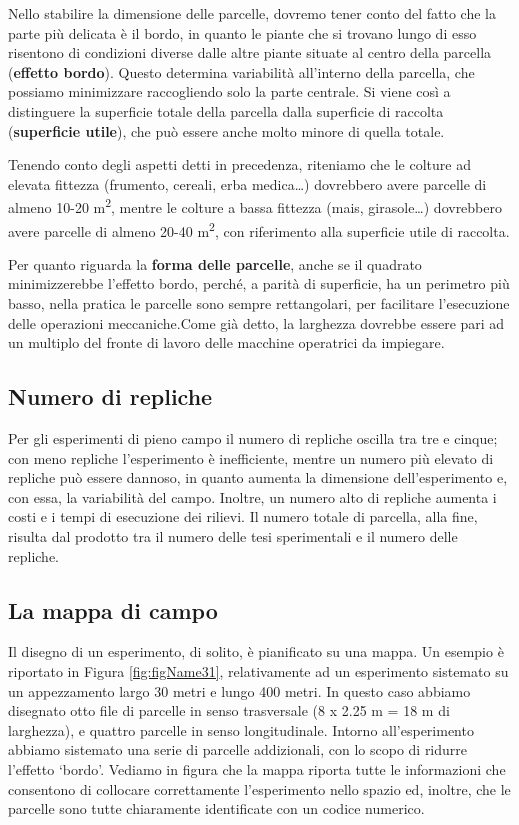\documentclass[a4paper,12pt,oneside]{book}
\begin{document}
Nello stabilire la dimensione delle parcelle, dovremo tener conto del fatto che la parte più delicata è il bordo, in quanto le piante che si trovano lungo di esso risentono di condizioni diverse dalle altre piante situate al centro della parcella (\textbf{effetto bordo}). Questo determina variabilità all'interno della parcella, che possiamo minimizzare raccogliendo solo la parte centrale. Si viene così a distinguere la superficie totale della parcella dalla superficie di raccolta (\textbf{superficie utile}), che può essere anche molto minore di quella totale.

Tenendo conto degli aspetti detti in precedenza, riteniamo che le colture ad elevata fittezza (frumento, cereali, erba medica\ldots) dovrebbero avere parcelle di almeno 10-20 m\textsuperscript{2}, mentre le colture a bassa fittezza (mais, girasole\ldots) dovrebbero avere parcelle di almeno 20-40 m\textsuperscript{2}, con riferimento alla superficie utile di raccolta.

Per quanto riguarda la \textbf{forma delle parcelle}, anche se il quadrato minimizzerebbe l'effetto bordo, perché, a parità di superficie, ha un perimetro più basso, nella pratica le parcelle sono sempre rettangolari, per facilitare l'esecuzione delle operazioni meccaniche.Come già detto, la larghezza dovrebbe essere pari ad un multiplo del fronte di lavoro delle macchine operatrici da impiegare.

\hypertarget{numero-di-repliche}{%
\subsection{Numero di repliche}\label{numero-di-repliche}}

Per gli esperimenti di pieno campo il numero di repliche oscilla tra tre e cinque; con meno repliche l'esperimento è inefficiente, mentre un numero più elevato di repliche può essere dannoso, in quanto aumenta la dimensione dell'esperimento e, con essa, la variabilità del campo. Inoltre, un numero alto di repliche aumenta i costi e i tempi di esecuzione dei rilievi. Il numero totale di parcella, alla fine, risulta dal prodotto tra il numero delle tesi sperimentali e il numero delle repliche.

\hypertarget{la-mappa-di-campo}{%
\subsection{La mappa di campo}\label{la-mappa-di-campo}}

Il disegno di un esperimento, di solito, è pianificato su una mappa. Un esempio è riportato in Figura \ref{fig:figName31}, relativamente ad un esperimento sistemato su un appezzamento largo 30 metri e lungo 400 metri. In questo caso abbiamo disegnato otto file di parcelle in senso trasversale (8 x 2.25 m = 18 m di larghezza), e quattro parcelle in senso longitudinale. Intorno all'esperimento abbiamo sistemato una serie di parcelle addizionali, con lo scopo di ridurre l'effetto `bordo'. Vediamo in figura che la mappa riporta tutte le informazioni che consentono di collocare correttamente l'esperimento nello spazio ed, inoltre, che le parcelle sono tutte chiaramente identificate con un codice numerico.
\end{document}
